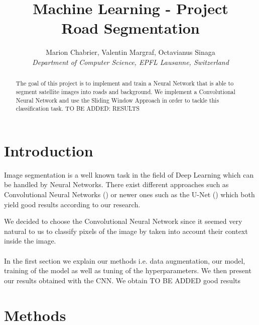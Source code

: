 \documentclass[10pt,conference,compsocconf]{IEEEtran}
\begin{document}
\title{Machine Learning - Project \\ Road Segmentation}

\author{
	Marion Chabrier, Valentin Margraf, Octavianus Sinaga\\
	\textit{Department of Computer Science, EPFL Lausanne, Switzerland}
}

\maketitle

\begin{abstract}
	The goal of this project is to implement and train a Neural Network that is able to segment satellite images into roads and background. We implement a Convolutional Neural Network and use the Sliding Window Approach in order to tackle this classification task. TO BE ADDED: RESULTS 
\end{abstract}

\section{Introduction}
Image segmentation is a well known task in the field of Deep Learning which can be handled by Neural Networks. There exist different approaches such as Convolutional Neural Networks (\cite{pixelwise}) or newer ones such as the U-Net (\cite{unet}) which both yield good results according to our research.

We decided to choose the Convolutional Neural Network since it seemed very natural to us to classify pixels of the image by taken into account their context inside the image. 
\\\\In the first section we explain our methods i.e. data augmentation, our model, training of the model as well as tuning of the hyperparameters.
We then present our results obtained with the CNN. We obtain TO BE ADDED good results



\section{Methods}
\end{document}
